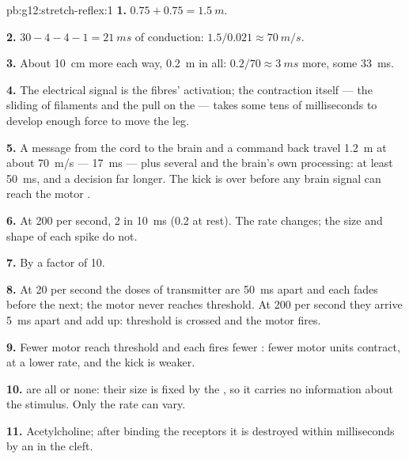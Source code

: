 \begin{solution}{pb:g12:stretch-reflex:1}
\textbf{1.} $0.75 + 0.75 = \qty{1.5}{m}$.

\textbf{2.} $30 - 4 - 4 - 1 = \qty{21}{ms}$ of conduction: $1.5/0.021
\approx \qty{70}{m/s}$.

\textbf{3.} About \qty{10}{cm} more each way, \qty{0.2}{m} in all:
$0.2/70 \approx \qty{3}{ms}$ more, some \qty{33}{ms}.

\textbf{4.} The electrical signal is the fibres' activation; the
contraction itself --- the sliding of filaments and the pull on the
 --- takes some tens of milliseconds to develop enough force to
move the leg.

\textbf{5.} A message from the cord to the brain and a command back
travel \qty{1.2}{m} at about \qty{70}{m/s} --- \qty{17}{ms} --- plus
several  and the brain's own processing: at least \qty{50}{ms},
and a decision far longer. The kick is over before any brain signal
can reach the motor .

\textbf{6.} At 200 per second, 2  in \qty{10}{ms}
(0.2 at rest). The rate changes; the size and shape of each spike do
not.

\textbf{7.} By a factor of 10.

\textbf{8.} At 20 per second the doses of transmitter are \qty{50}{ms}
apart and each fades before the next; the motor  never reaches
threshold. At 200 per second they arrive \qty{5}{ms} apart and add
up: threshold is crossed and the motor  fires.

\textbf{9.} Fewer motor  reach threshold and each fires fewer
: fewer motor units contract, at a lower rate, and
the kick is weaker.

\textbf{10.}  are all or none: their size is fixed by
the , so it carries no information about the stimulus. Only the
rate can vary.

\textbf{11.} Acetylcholine; after binding the receptors it is destroyed
within milliseconds by an  in the cleft.


\end{solution}
